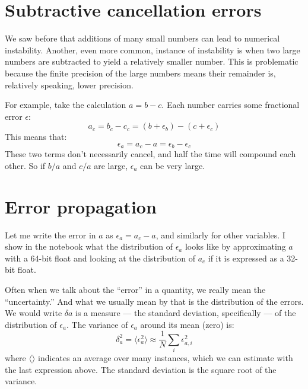 \section{Subtractive cancellation errors}

We saw before that additions of many small numbers can lead to
numerical instability. Another, even more common, instance of
instability is when two large numbers are subtracted to yield a
relatively smaller number. This is problematic because the finite
precision of the large numbers means their remainder is, relatively
speaking, lower precision.

For example, take the calculation $a = b - c$. 
Each number carries some fractional error $\epsilon$:
\begin{equation}
a_c = b_c - c_c = (b+\epsilon_b) - (c+\epsilon_c)
\end{equation}
This means that:
\begin{equation}
\epsilon_a = a_c - a = \epsilon_b - \epsilon_c
\end{equation}
These two terms don't necessarily cancel, and half the time will
compound each other. So if $b/a$ and $c/a$ are large, $\epsilon_a$ can
be very large. 

\section{Error propagation}

Let me write the error in $a$ as $\epsilon_a = a_c - a$, and similarly
for other variables.  I show in the notebook what the distribution of
$\epsilon_a$ looks like by approximating $a$ with a 64-bit float and
looking at the distribution of $a_c$ if it is expressed as a 32-bit
float. 

Often when we talk about the ``error'' in a quantity, we really mean
the ``uncertainty.'' And what we usually mean by that is the
distribution of the errors.  We would write $\delta a$ is a measure
--- the standard deviation, specifically --- of the distribution of
$\epsilon_a$.  The variance of $\epsilon_a$ around its mean (zero) is:
\begin{equation}
\delta_a^2 = \langle \epsilon_a^2 \rangle \approx \frac{1}{N}\sum_i
\epsilon_{a,i}^2
\end{equation}
where $\langle\rangle$ indicates an average over many instances, which we
can estimate with the last expression above. The standard deviation is
the square root of the variance.


